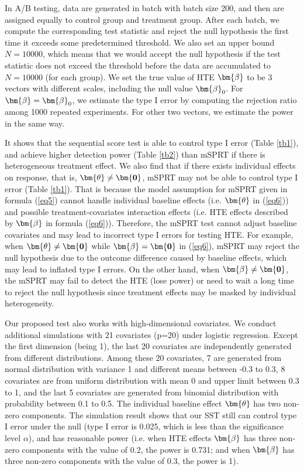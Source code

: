 \documentclass[letterpaper]{article}
\newcommand{\V}[1]{{\bm{\mathbf{\MakeLowercase{#1}}}}} %
\begin{document}
In A/B testing, data are generated in batch with batch size 200, and then are assigned equally to control group and treatment group. After each batch, we compute the corresponding test statistic and reject the null hypothesis the first time it exceeds some predetermined threshold. We also set an upper bound $N=10000$, which means that we would accept the null hypothesis if the test statistic does not exceed the threshold before the data are accumulated to $N=10000$ (for each group). We set the true value of HTE $\V{\beta}$ to be 3 vectors with different scales, including the null value $\V{\beta}_0$. For $\V{\beta}=\V{\beta}_0$, we estimate the type I error by computing the rejection ratio among 1000 repeated experiments. For other two vectors, we estimate the power in the same way.

It shows that the sequential score test is able to control type I error (Table \ref{tb1}), and achieve higher detection power (Table \ref{tb2}) than mSPRT if there is heterogeneous treatment effect. We also find that if there exists individual effects on response, that is, $\V{\theta}\neq \V{0}$, mSPRT may not be able to control type I error (Table \ref{tb1}). That is because the model assumption for mSPRT given in formula (\ref{eq5}) cannot handle individual baseline effects (i.e. $\V{\theta}$ in (\ref{eq6})) and possible treatment-covariates interaction effects (i.e. HTE effects described by $\V{\beta}$ in formula (\ref{eq6})). Therefore, the mSPRT test cannot adjust baseline covariates and may lead to incorrect type I errors for testing HTE. For example, when $\V{\theta} \neq \V{0}$ while $\V{\beta} = \V{0}$ in (\ref{eq6}), mSPRT may reject the null hypothesis due to the outcome difference caused by baseline effects, which may lead to inflated type I errors. On the other hand, when $\V{\beta} \neq \V{0}$, the mSPRT may fail to detect the HTE (lose power) or need to wait a long time to reject the null hypothesis since treatment effects may be masked by individual heterogeneity.

Our proposed test also works with high-dimensional covariates. We conduct additional simulations with 21 covariates (p=20) under logistic regression. Except the first dimension (being 1), the last 20 covariates are independently generated from different distributions. Among these 20 covariates, 7 are generated from normal distribution with variance 1 and different means between -0.3 to 0.3, 8 covariates are from uniform distribution with mean 0 and upper limit between 0.3 to 1, and the last 5 covariates are generated from binomial distribution with probability between 0.1 to 0.5. The individual baseline effect $\V{\theta}$ has two non-zero components. The simulation result shows that our SST still can control type I error under the null (type I error is 0.025, which is less than the significance level $\alpha$), and has reasonable power (i.e. when HTE effects $\V{\beta}$ has three non-zero components with the value of 0.2, the power is 0.731; and when $\V{\beta}$ has three non-zero components with the value of 0.3, the power is 1).
\end{document}
